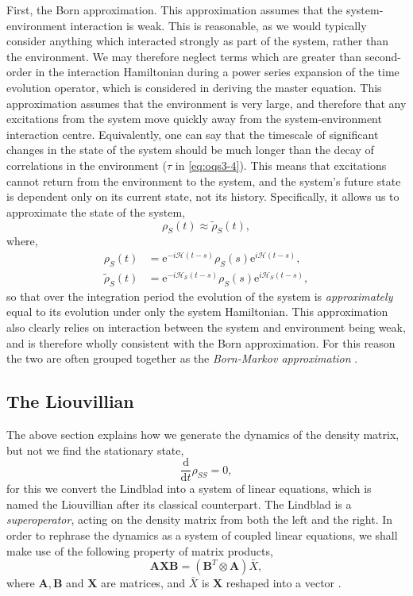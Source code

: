 First, the Born approximation. This approximation assumes that the system-environment interaction is weak. This is reasonable, as we would typically consider anything which interacted strongly as part of the system, rather than the environment. We may therefore neglect terms which are greater than second-order in the interaction Hamiltonian during a power series expansion of the time evolution operator, which is considered in deriving the master equation. This approximation assumes that the environment is very large, and therefore that any excitations from the system move quickly away from the system-environment interaction centre. Equivalently, one can say that the timescale of significant changes in the state of the system should be much longer than the decay of correlations in the environment (\(\tau\) in \cref{eq:oqs3-4}). This means that excitations cannot return from the environment to the system, and the system's future state is dependent only on its current state, not its history. Specifically, it allows us to approximate the state of the system,
\begin{equation}
	\rho_{S}(t) \approx \tilde{\rho}_{S}(t),
	\label{eq:oqs3-5}
\end{equation}
where,
\begin{align}
	\rho_{S}(t) &= \mathrm{e}^{-i\mathcal{H}(t-s)}\rho_{S}(s)\mathrm{e}^{i\mathcal{H}(t-s)}, \label{eq:oqs3-6} \\
	\tilde{\rho}_{S}(t) &= \mathrm{e}^{-i\mathcal{H_{S}}(t-s)}\rho_{S}(s)\mathrm{e}^{i\mathcal{H}_{S}(t-s)}, \label{eq:oqs3-7}
\end{align}
so that over the integration period the evolution of the system is \emph{approximately} equal to its evolution under only the system Hamiltonian. This approximation also clearly relies on interaction between the system and environment being weak, and is therefore wholly consistent with the Born approximation. For this reason the two are often grouped together as the \emph{Born-Markov approximation} \cite{Hartmann_BM,BP_BMS}.

\subsection{The Liouvillian}
The above section explains how we generate the dynamics of the density matrix, but not we find the stationary state,
\begin{equation}
	\frac{\mathrm{d}}{\mathrm{d}t}\rho_{SS} = 0,
	\label{eq:oqs4-1}
\end{equation}
for this we convert the Lindblad into a system of linear equations, which is named the Liouvillian after its classical counterpart. The Lindblad is a \emph{superoperator}, acting on the density matrix from both the left and the right. In order to rephrase the dynamics as a system of coupled linear equations, we shall make use of the following property of matrix products,
\begin{equation}
	 \mathbf{A}\mathbf{X}\mathbf{B} = \left(\mathbf{B}^{T} \otimes \mathbf{A}\right)\bar{X},
	 \label{eq:oqs4-2}
\end{equation}
 where \(\mathbf{A}, \mathbf{B}\) and \(\mathbf{X}\) are matrices, and \(\bar{X}\) is \(\mathbf{X}\) reshaped into a vector \cite{Macedo2013,Roth1934}. 
 
